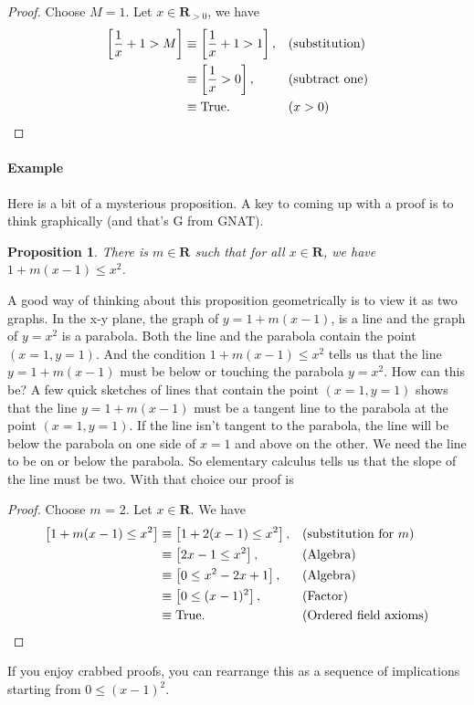 \documentclass[12pt,fleqn]{article}
\newcommand{\reals}{\mathbf{R}}
\newcommand{\true}{\mathrm{True}}
\newenvironment{myproof}
  {\begin{shaded}\begin{proof}}
  {\end{proof}\end{shaded}}
\newtheorem{prop}{Proposition}
\newcounter{ex}\setcounter{ex}{0}
\newcommand{\ex}{%
\setcounter{ex}{\value{ex}+1}
\paragraph{Example \theex}}
\begin{document}
    \begin{myproof} Choose $M=1$. Let $x  \in \reals_{>0}$, we have
    \begin{align*}
      \left [ \frac{1}{x} + 1 > M \right] &\equiv    \left [ \frac{1}{x} + 1 > 1 \right], &&(\text{substitution}) \\
                                                               &\equiv    \left [ \frac{1}{x}  > 0 \right], &&(\text{subtract one}) \\
                                                               &\equiv \true.    &&  (x > 0) \qedhere
  \end{align*} 
    
    
    \end{myproof}


    \ex Here is a bit of a mysterious proposition. A key to coming 
    up with a proof is to think graphically (and that's G from GNAT).
        \begin{prop}
      There is $m \in \reals$ such that for all $x \in \reals$, we 
     have $1 + m(x-1) \leq x^2$. 
     \end{prop}
     
      A good way of thinking about this proposition geometrically is to view it as two graphs. In the x-y plane, the graph of  $y = 1 + m(x-1)$, is a line  and the
      graph of $y = x^2$  is a parabola.   Both the line  and the parabola contain the point $(x=1,y=1)$. And the 
      condition $1 + m(x-1) \leq x^2$ tells
      us that the line $y = 1 + m(x-1)$ must be below or touching the parabola $y=x^2$.  How can this be? A few quick sketches of lines that
      contain the point $(x=1,y=1)$  shows that the line $y = 1 + m(x-1)$ must be a tangent line to the parabola at the point $(x=1,y=1)$.  If 
      the line isn't tangent to the parabola, the line will be below the parabola on one side of $x=1$ and above on the other.   We need the
      line to be on or below the parabola.  So   elementary calculus tells us that the slope of the line must be two. With that choice
      our proof is      
       \begin{myproof} Choose $m$ = 2. Let $x\in \reals$. We have
       \begin{align*}
         \left[1 + m(x-1) \leq x^2  \right] &\equiv \left[1+2(x-1) \leq  x^2 \right], && \text{(substitution for $m$)} \\
                                      &\equiv \left[2x-1 \leq x^2 \right], 
                                       &&\text{(Algebra)} \\
                                    &\equiv \left[0 \leq x^2 -2x+1 \right], 
                                       &&\text{(Algebra)} \\
                                    &\equiv \left[0 \leq (x-1)^2 \right], 
                                       &&\text{(Factor)} \\
                                      &\equiv \true. &&\text{(Ordered field axioms)} \qedhere
       \end{align*}
       \end{myproof}
       \noindent If you enjoy crabbed proofs, you can rearrange this as a sequence of implications starting from $0 \leq (x-1)^2$. 
   
\end{document}
